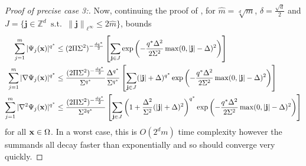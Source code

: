 \documentclass[10pt,a4paper,onecolumn]{article} \usepackage[latin1]{inputenc}
\numberwithin{equation}{section}
\let\F\mathds\let\C\mathcal\newcommand{\R}{\F{R}}\newcommand{\A}{\C{A}}
\newcommand{\norm}[1]{{\left\lVert #1 \right\rVert}}
\DeclareMathOperator{\st}{\;s.t.\;}\DeclareMathOperator{\as}{\;a.s.\;}\renewcommand{\epsilon}{\varepsilon}
\renewcommand{\vec}{\mathbf}
\newcommand{\UCmath}[1]{%
	\begingroup
	\ucmathlist\uppercase\expandafter{#1}%
	\endgroup
}
\newcommand{\ucmathlist}{%
	\def\alpha{\mathrm{A}}%
	\def\beta{\mathrm{B}}%
	\let\gamma=\Gamma
	\let\delta=\Delta
	\def\epsilon{\mathrm{E}}%
	\def\varepsilon{\mathrm{E}}%
	\def\zeta{\mathrm{Z}}%
	\def\eta{\mathrm{H}}%
	\let\theta=\Theta
	\let\vartheta=\Theta
	\def\iota{\mathrm{I}}%
	\def\kappa{\mathrm{K}}%
	\let\lambda=\Lambda
	\def\mu{\mathrm{M}}%
	\def\nu{\mathrm{N}}%
	\let\xi=\Xi
	\let\pi=\Pi
	\let\varpi=\Pi
	\def\rho{\mathrm{P}}%
	\def\varrho{\mathrm{P}}%
	\let\sigma=\Sigma
	\def\tau{\mathrm{T}}%
	\let\upsilon=\Upsilon
	\let\phi=\Phi
	\let\varphi=\Phi
	\def\chi{\mathrm{X}}%
	\let\psi=\Psi
	\let\omega=\Omega
}
\newcommand{\caps}[1]{\UCmath{#1}}
\newcommand*{\vard}[1]{%
	\IfEqCase{#1}{%
		{0}{\varphi}%
		{1}{\psi}%
	}[\varphi #1]%
}
\newcommand*{\varx}[1]{%
	\IfEqCase{#1}{%
		{0}{x}%
		{1}{y}%
		{2}{z}%
		{3}{r}%
	}[x#1]%
}
\newcommand{\Domain}{\Omega}
\newcommand*{\Varx}[1]{\caps{\varx{#1}}}
\newcommand*{\vvarx}[1]{\vec{\varx{#1}}}\newcommand*{\vVarx}[1]{\vec{\Varx{#1}}}
\begin{document}
\begin{proof}[Proof of precise case 3:]
	Now, continuing the proof of , for $\hat m=\sqrt[d]{m}$, $\delta=\frac{\sqrt{d}}{2}$ and $J=\{\vec{j}\in\F Z^d \st \norm{\vec{j}}_{\ell^\infty}\leq 2\hat m\}$,  bounds 
	\begin{align*}
		\sum_{j=1}^m |\vard1_j(\vvarx0)|^{q^*} &\leq (2\pi\sigma^2)^{-\frac{dq^*}{2}} \left[\sum_{\vec{j}\in J} \exp\left(-\frac{q^*\Delta^2}{2\sigma^2}\max(0,|\vec{j}|-\delta)^2\right)\right]
		\\\sum_{j=1}^m |\nabla\vard1_j(\vvarx0)|^{q^*} &\leq \frac{(2\pi\sigma^2)^{-\frac{dq^*}{2}}}{\sigma^{q^*}}\frac{\Delta^{q^*}}{\sigma^{q^*}} \left[\sum_{\vec{j}\in J} (|\vec{j}|+\delta)^{q^*}\exp\left(-\frac{q^*\Delta^2}{2\sigma^2}\max(0,|\vec{j}|-\delta)^2\right)\right]
		\\\sum_{j=1}^m |\nabla^2\vard1_j(\vvarx0)|^{q^*} &\leq \frac{(2\pi\sigma^2)^{-\frac{dq^*}{2}}}{\sigma^{2q^*}} \left[\sum_{\vec{j}\in J} \left(1+\frac{\Delta^2}{\sigma^2}(|\vec{j}|+\delta)^2\right)^{q^*}\exp\left(-\frac{q^*\Delta^2}{2\sigma^2}\max(0,|\vec{j}|-\delta)^2\right)\right]
	\end{align*}
	for all $\vvarx0\in\Domain$. In a worst case, this is $O(2^dm)$ time complexity however the summands all decay faster than exponentially and so should converge very quickly.	
\end{proof}
\end{document}
